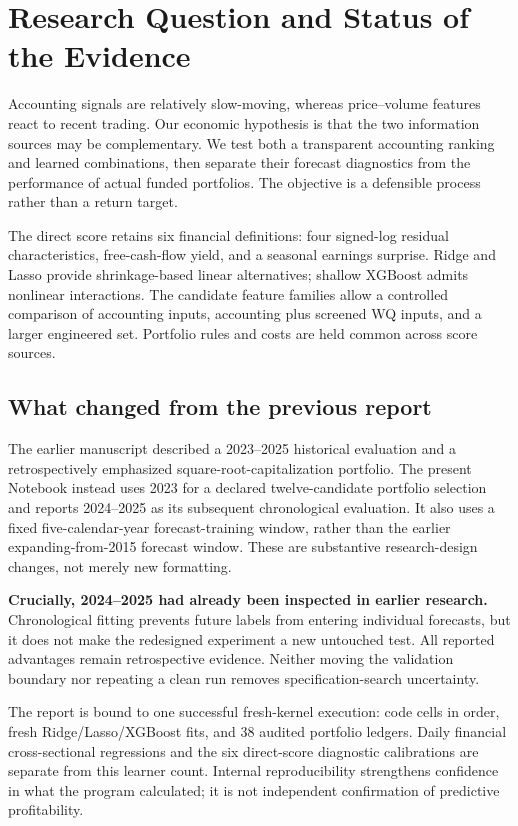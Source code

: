 \documentclass[11pt]{article}
\begin{document}
\section{Research Question and Status of the Evidence}
Accounting signals are relatively slow-moving, whereas price--volume features react to recent trading. Our economic hypothesis is that the two information sources may be complementary. We test both a transparent accounting ranking and learned combinations, then separate their forecast diagnostics from the performance of actual funded portfolios. The objective is a defensible process rather than a return target.

The direct score retains six financial definitions: four signed-log residual characteristics, free-cash-flow yield, and a seasonal earnings surprise. Ridge and Lasso provide shrinkage-based linear alternatives; shallow XGBoost admits nonlinear interactions. The candidate feature families allow a controlled comparison of accounting inputs, accounting plus screened WQ inputs, and a larger engineered set. Portfolio rules and costs are held common across score sources.

\subsection{What changed from the previous report}
The earlier manuscript described a 2023--2025 historical evaluation and a retrospectively emphasized square-root-capitalization portfolio. The present Notebook instead uses 2023 for a declared twelve-candidate portfolio selection and reports 2024--2025 as its subsequent chronological evaluation. It also uses a fixed five-calendar-year forecast-training window, rather than the earlier expanding-from-2015 forecast window. These are substantive research-design changes, not merely new formatting.

\textbf{Crucially, 2024--2025 had already been inspected in earlier research.} Chronological fitting prevents future labels from entering individual forecasts, but it does not make the redesigned experiment a new untouched test. All reported advantages remain retrospective evidence. Neither moving the validation boundary nor repeating a clean run removes specification-search uncertainty.

The report is bound to one successful fresh-kernel execution: \CodeCells{} code cells in order, \FitCount{} fresh Ridge/Lasso/XGBoost fits, and 38 audited portfolio ledgers. Daily financial cross-sectional regressions and the six direct-score diagnostic calibrations are separate from this learner count. Internal reproducibility strengthens confidence in what the program calculated; it is not independent confirmation of predictive profitability.
\clearpage
\end{document}
